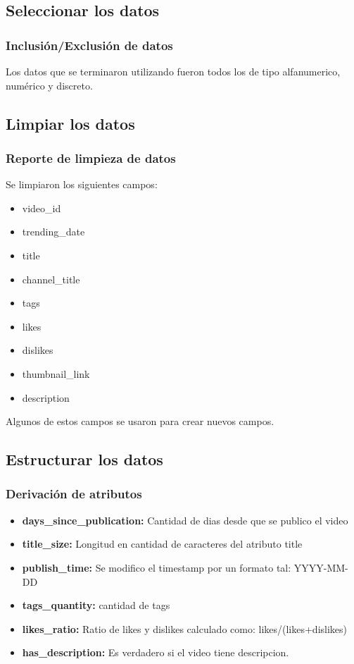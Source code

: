 \subsection{Seleccionar los datos}
    \subsubsection{Inclusión/Exclusión de datos}
        Los datos que se terminaron utilizando fueron todos los de tipo
        alfanumerico, numérico y discreto.
\subsection{Limpiar los datos}
    \subsubsection{Reporte de limpieza de datos}
        Se limpiaron los siguientes campos:
        \begin{itemize}
            \item video\_id
            \item trending\_date
            \item title
            \item channel\_title
            \item tags
            \item likes
            \item dislikes
            \item thumbnail\_link
            \item description
        \end{itemize}
        Algunos de estos campos se usaron para crear nuevos campos.
\subsection{Estructurar los datos}
    \subsubsection{Derivación de atributos}
        \begin{itemize}
            \item \textbf{days\_since\_publication:} Cantidad de dias desde que se publico el video
            \item \textbf{title\_size:} Longitud en cantidad de caracteres del atributo title
            \item \textbf{publish\_time:} Se modifico el timestamp por un formato tal: YYYY-MM-DD
            \item \textbf{tags\_quantity:} cantidad de tags
            \item \textbf{likes\_ratio:} Ratio de likes y dislikes calculado como: likes/(likes+dislikes)
            \item \textbf{has\_description:} Es verdadero si el video tiene descripcion.
        \end{itemize}
